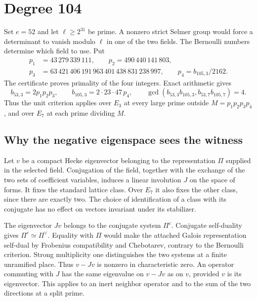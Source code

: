 \documentclass[11pt,a4paper]{article}
\begin{document}
\newpage
\section{Degree 104}
\label{sec:degree104}

Set \(e=52\) and let \(\ell\ge 2^{31}\) be prime. A nonzero
strict Selmer group would force a determinant to vanish modulo \(\ell\) in
one of the two fields. The Bernoulli numbers determine which field to use.
Put
\[
\begin{split}
 p_1&=43\,279\,339\,111,\qquad p_2=490\,440\,141\,803,\\
 p_3&=63\,421\,406\,191\,963\,401\,438\,831\,238\,997,\qquad
 p_4=b_{105,3}/2162.
\end{split}
\]
The certificate proves primality of the four integers. Exact arithmetic gives
\[
 b_{53,3}=2p_1p_2p_3,\qquad b_{105,3}=2\cdot23\cdot47\,p_4,
 \qquad \gcd(b_{53,3}b_{105,3},b_{53,7}b_{105,7})=4.
\]
Thus the unit criterion applies over \(E_3\) at every large prime outside
\(M=p_1p_2p_3p_4\), and over \(E_7\) at each prime dividing \(M\).

\subsection{Why the negative eigenspace sees the witness}
Let \(v\) be a compact Hecke eigenvector belonging to the representation
\(\Pi\) supplied in the selected field. Conjugation of the field, together
with the exchange of the two sets of coefficient variables, induces a
linear involution \(J\) on the space of forms. It fixes the standard lattice
class. Over \(E_7\) it also fixes the other class, since there are exactly
two. The choice of identification of a class with its conjugate has no
effect on vectors invariant under its stabilizer.

The eigenvector \(Jv\) belongs to the conjugate system \(\Pi^c\).
Conjugate self-duality gives \(\Pi^c\simeq\Pi^\vee\). Equality with \(\Pi\)
would make the attached Galois representation self-dual by Frobenius
compatibility and Chebotarev, contrary to the Bernoulli criterion.
Strong multiplicity one distinguishes the two systems at a finite
unramified place. Thus \(v-Jv\) is nonzero in characteristic zero. An
operator commuting with \(J\) has the same eigenvalue on \(v-Jv\) as on
\(v\), provided \(v\) is its eigenvector. This applies to an inert neighbor
operator and to the sum of the two directions at a split prime.
\end{document}
